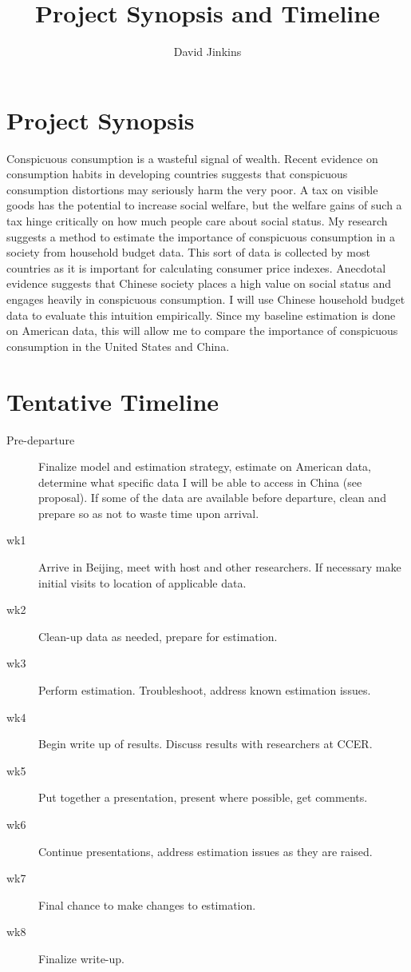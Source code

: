 \documentclass[a4paper,10pt]{article}
\title{Project Synopsis and Timeline}
\author{David Jinkins}
\begin{document}
\maketitle

\section{Project Synopsis}
Conspicuous consumption is a wasteful signal of wealth. Recent evidence on consumption habits in developing countries suggests that conspicuous consumption distortions may seriously harm the very poor.  A tax on visible goods has the potential to increase social welfare, but the welfare gains of such a tax hinge critically on how much people care about social status. My research suggests a method to estimate the importance of conspicuous consumption in a society from household budget data.  This sort of data is collected by most countries as it is important for calculating consumer price indexes.  Anecdotal evidence suggests that Chinese society places a high value on social status and engages heavily in conspicuous consumption.  I will use Chinese household budget data to evaluate this intuition empirically.  Since my baseline estimation is done on American data, this will allow me to compare the importance of conspicuous consumption in the United States and China.     

\section{Tentative Timeline}
\begin{description}
 \item [Pre-departure] Finalize model and estimation strategy, estimate on American data, determine what specific data I will be able to access in China (see proposal).  If some of the data are available before departure, clean and prepare so as not to waste time upon arrival. 
 \item [wk1] Arrive in Beijing, meet with host and other researchers. If necessary make initial visits to location of applicable data.
 \item [wk2] Clean-up data as needed, prepare for estimation.
 \item [wk3] Perform estimation.  Troubleshoot, address known estimation issues.
 \item [wk4] Begin write up of results.  Discuss results with researchers at CCER.
 \item [wk5] Put together a presentation, present where possible, get comments.
 \item [wk6] Continue presentations, address estimation issues as they are raised.
 \item [wk7] Final chance to make changes to estimation.
 \item [wk8] Finalize write-up.
\end{description}
\end{document}
